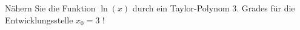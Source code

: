 \item
Nähern Sie die Funktion $\ln(x)$ durch ein Taylor-Polynom 3. Grades für die Entwicklungsstelle $x_0=3$ !
